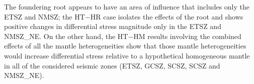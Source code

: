 \documentclass[draft,linenumbers]{agujournal2018}
\begin{document}
    The foundering root appears to have an area of influence that includes only the ETSZ and NMSZ; the HT$-$HR case isolates the effects of the root and shows positive changes in differential stress magnitude only in the ETSZ and NMSZ\_NE. On the other hand, the HT$-$HM results involving the combined effects of all the mantle heterogeneities show that those mantle heterogeneities would increase differential stress relative to a hypothetical homogeneous mantle in all of the considered seismic zones (ETSZ, GCSZ, SCSZ, SCSZ and NMSZ\_NE). 
    
    
\end{document}
